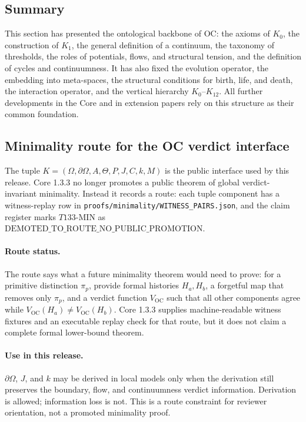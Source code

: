 \subsection{Summary}

This section has presented the ontological backbone of OC:
the axioms of \(K_0\), the construction of \(K_1\), the general definition of a continuum,
the taxonomy of thresholds, the roles of potentials, flows, and structural tension,
and the definition of cycles and continuumness.
It has also fixed the evolution operator, the embedding into meta-spaces, the
structural conditions for birth, life, and death, the interaction operator, and
the vertical hierarchy \(K_0\)–\(K_{12}\).
All further developments in the Core and in extension papers rely on this structure as their common foundation.


\subsection{Minimality route for the OC verdict interface}
\label{sec:oc13-global-verdict-minimality}

The tuple \(K=(\Omega,\partial\Omega,A,\Theta,P,J,C,k,M)\) is the public interface
used by this release. Core 1.3.3 no longer promotes a public theorem of global
verdict-invariant minimality. Instead it records a route: each tuple component
has a witness-replay row in \texttt{proofs/minimality/WITNESS\_PAIRS.json}, and the
claim register marks \(T133\)-MIN as
\(\mathrm{DEMOTED\_TO\_ROUTE\_NO\_PUBLIC\_PROMOTION}\).

\paragraph{Route status.}
The route says what a future minimality theorem would need to prove: for a
primitive distinction \(\pi_p\), provide formal histories \(H_a,H_b\), a
forgetful map that removes only \(\pi_p\), and a verdict function
\(V_{\mathrm{OC}}\) such that all other components agree while
\(V_{\mathrm{OC}}(H_a)\neq V_{\mathrm{OC}}(H_b)\).  Core 1.3.3 supplies
machine-readable witness fixtures and an executable replay check for that
route, but it does not claim a complete formal lower-bound theorem.

\paragraph{Use in this release.}
\(\partial\Omega\), \(J\), and \(k\) may be derived in local models only when
the derivation still preserves the boundary, flow, and continuumness verdict
information. Derivation is allowed; information loss is not. This is a route
constraint for reviewer orientation, not a promoted minimality proof.

